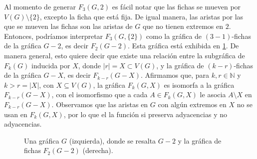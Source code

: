 Al momento de generar $F_3(G,2)$ es f\'acil notar que las fichas se mueven
por $V(G) \setminus \{2\}$, excepto la ficha que est\'a fija. De igual manera,
las aristas por las que se mueven las fichas son las aristas de $G$ que no
tienen extremos en $2$. Entonces, podr\'iamos interpretar $F_3(G,\{2\})$ como la
gr\'afica de $(3-1)$-fichas de la gr\'afica $G-2$, es decir $F_2(G-2)$. Esta
gr\'afica est\'a exhibida en \cref{fig:ex-tok-subgraph-aux}. De manera general,
esto quiere decir que existe una relaci\'on entre la subgr\'afica de $F_k(G)$
inducida por $X$, donde $|r|=X \subset V(G)$, y la gr\'afica de $(k-r)$-fichas
de la gr\'afica $G-X$, es decir $F_{k-r}(G-X)$. Afirmamos que, para $k,r \in
\mathbb{N}$ y $k>r = |X|$, con $X \subseteq V(G)$, la gr\'afica $F_k(G,X)$ es
isomorfa a la gr\'afica $F_{k-r}(G-X)$, con el isomorfismo que a cada $A \in
F_k(G,X)$ le asocia $A \setminus X$ en $F_{k-r}(G-X)$.   Observamos que las
aristas en $G$ con alg\'un extremos en $X$ no se usan en $F_k(G,X)$, por lo que
el la funci\'on si preserva adyacencias y no adyacencias.

\begin{figure}[ht!]
    \centering
    \caption{Una gr\'afica $G$ (izquierda), donde se resalta $G-2$ y la 
    gr\'afica de fichas $F_2(G-2)$ (derecha).}
    \label{fig:ex-tok-subgraph-aux}
\end{figure}

